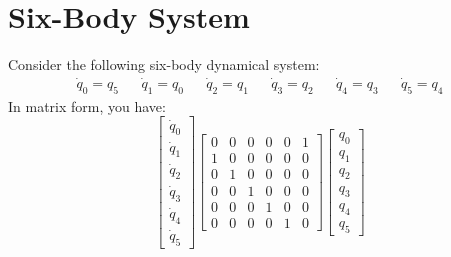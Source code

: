 \section{Six-Body System}
Consider the following six-body dynamical system:
\begin{align}
    \dot{q}_{0} = q_{5} && \dot{q}_{1} = q_{0} && \dot{q}_{2} = q_{1} && \dot{q}_{3} = q_{2} && \dot{q}_{4} = q_{3} && \dot{q}_{5} = q_{4}
\end{align}
In matrix form, you have:
\begin{equation}
    \begin{bmatrix}
        \dot{q}_{0} \\ \dot{q}_{1} \\ \dot{q}_{2} \\ \dot{q}_{3} \\ \dot{q}_{4} \\ \dot{q}_{5}
    \end{bmatrix} \begin{bmatrix}
        0 & 0 & 0 & 0 & 0 & 1 \\
        1 & 0 & 0 & 0 & 0 & 0 \\
        0 & 1 & 0 & 0 & 0 & 0 \\
        0 & 0 & 1 & 0 & 0 & 0 \\
        0 & 0 & 0 & 1 & 0 & 0 \\
        0 & 0 & 0 & 0 & 1 & 0
    \end{bmatrix} \begin{bmatrix}
        q_{0} \\ q_{1} \\ q_{2} \\ q_{3} \\ q_{4} \\ q_{5}
    \end{bmatrix}
\end{equation}

